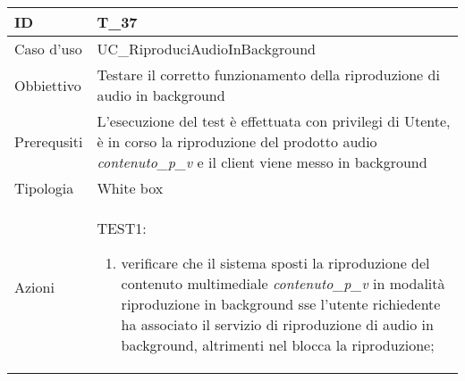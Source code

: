 \begin{table}[hb]
    \centering
    \begin{tabular}{ |p{2cm}|p{10cm}|  }
        \hline
        ID          & T\_37                                                                                                                                                                  \\\hline
        Caso d'uso  & UC\_RiproduciAudioInBackground                                                                                                                                         \\\hline
        Obbiettivo  & Testare il corretto funzionamento della riproduzione di audio in background                                                                                            \\\hline
        Prerequsiti & L'esecuzione del test è effettuata con privilegi di Utente, è in corso la riproduzione del prodotto audio \emph{contenuto\_p\_v} e il client viene messo in background \\\hline
        Tipologia   & White box                                                                                                                                                              \\\hline
        Azioni      &
        TEST1:
        \begin{enumerate}[nosep, topsep=0pt]
            \item verificare che il sistema sposti la riproduzione del contenuto multimediale \emph{contenuto\_p\_v} in modalità riproduzione in background sse l'utente richiedente ha associato il servizio di riproduzione di audio in background, altrimenti nel blocca la riproduzione;
        \end{enumerate}
        \\\hline
    \end{tabular}
\end{table}

